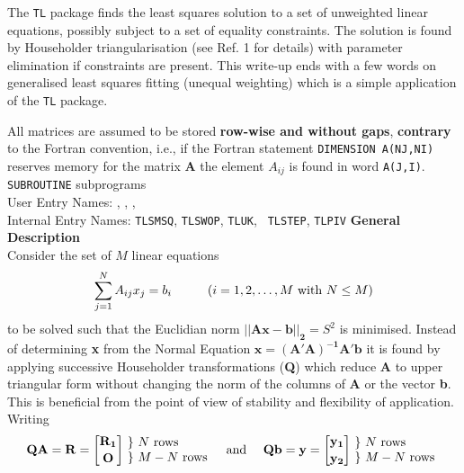                                 
                    
\Submitter{}                                 
                           
The {\tt TL} package finds the least squares solution to a set of
unweighted linear equations, possibly subject to a set of equality
constraints. The solution is found by Householder triangularisation
(see Ref. 1 for details) with parameter elimination if constraints are
present. This write-up ends with a few words on generalised least
squares fitting (unequal weighting) which is a simple application of
the {\tt TL} package.
\par
All matrices are assumed to be stored {\bf row-wise and without gaps},
{\bf contrary} to the Fortran convention, i.e., if the
Fortran statement {\tt DIMENSION  A(NJ,NI)} reserves
memory for the matrix {\bf A} the element $A_{ij}$ is found in word
{\tt A(J,I)}.
\Structure
{\tt SUBROUTINE} subprograms\\
User Entry  Names: , , , \\
Internal Entry Names: {\tt TLSMSQ}, {\tt TLSWOP}, {\tt TLUK}, {\tt
TLSTEP}, {\tt TLPIV}
\Usage
 {\bf General Description}\\[2mm]
Consider the set of $M$ linear equations
$$ \sum^N_{j=1} A_{ij}x_j = b_i
\mbox{\hspace{1cm}} (i=1,2,\ldots,M \ \mbox{with} \ N\leq M)$$
to be solved such that the Euclidian norm
$\mathbf{||Ax - b||_2} = S^2$ is minimised. Instead of determining
{\bf x} from the Normal Equation $\mathbf{x = (A'A)^{-1} A'b}$
it is found by applying successive Householder transformations
({\bf Q}) which reduce {\bf A} to upper triangular
form without changing the norm of the columns of {\bf A} or the vector
{\bf b}. This is beneficial from the point of view of stability and
flexibility of application. Writing
$$\mathbf{QA = R = \binoms{R_1}{O}}
\begin{array}{@{ \ \} \ }l} N \ \mbox{rows} \\ M-N \ \mbox{rows}
\end{array}
\mbox{\quad and \quad} \mathbf{Qb = y = \binoms{y_1}{y_2}}
\begin{array}{@{ \ \} \ }l} N \ \mbox{rows} \\ M-N \ \mbox{rows}
\end{array} $$

